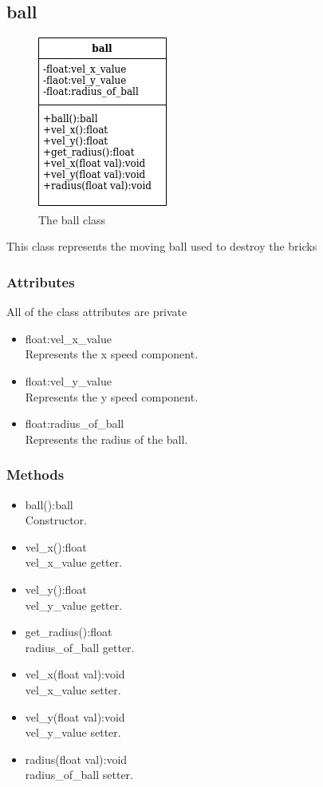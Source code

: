 \documentclass[]{article}
\begin{document}
\subsection{ball}
\begin{figure}[h!]
    \centering
    \includegraphics[scale=0.5]{ball.jpg}
    \caption{The ball class}
    \label{fig:ball class diagram }
\end{figure}
This class represents the moving ball used to destroy the bricks
\subsubsection{Attributes}
All of the class attributes are private
	\begin{itemize}
		\item float:vel\_x\_value\\ Represents the x speed component.
		\item float:vel\_y\_value\\ Represents the y speed component.
		\item float:radius\_of\_ball\\ Represents the radius of the ball. 
	\end{itemize}
\subsubsection{Methods}
	\begin{itemize}
		\item ball():ball \\Constructor.
		\item vel\_x():float \\vel\_x\_value getter.
		\item vel\_y():float\\vel\_y\_value getter.
		\item get\_radius():float\\ radius\_of\_ball getter.
		\item vel\_x(float val):void \\ vel\_x\_value setter.
		\item vel\_y(float val):void \\vel\_y\_value setter.
		\item radius(float val):void \\ radius\_of\_ball setter.
	\end{itemize}
\end{document}
